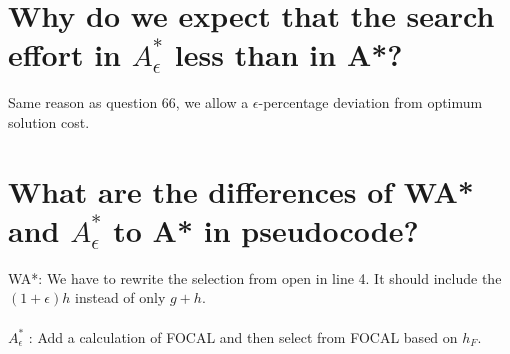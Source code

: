 \documentclass[12pt, a4paper]{article}
\begin{document}
\section{Why do we expect that the search effort in $A^*_\epsilon$ less than in A*?}
Same reason as question 66, we allow a $\epsilon$-percentage deviation from optimum solution cost.

\section{What are the differences of WA* and $A^*_\epsilon$ to A* in pseudocode?}
WA*: We have to rewrite the selection from open in line 4. It should include the $(1 + \epsilon)h$ instead of only $g + h$. \\ \\
$A^*_\epsilon$ : Add a calculation of FOCAL and then select from FOCAL based on $h_F$.
\end{document}
